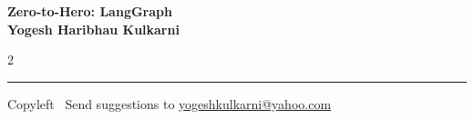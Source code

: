 \documentclass[8pt,landscape]{article}
\begin{document}
\footnotesize


\begin{center}
\Large{\textbf{Zero-to-Hero: LangGraph\\ Yogesh Haribhau Kulkarni}}
\end{center}

\begin{multicols}{2}

\end{multicols}

\rule{\linewidth}{0.25pt}
\scriptsize
Copyleft \textcopyleft\  Send suggestions to
\href{http://www.yogeshkulkarni.com}{yogeshkulkarni@yahoo.com}
\end{document}
